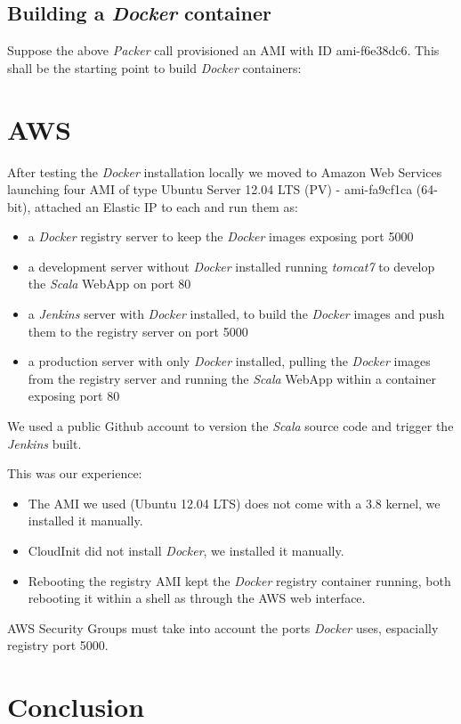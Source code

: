\documentclass[captions=tableheading]{article}
\begin{document}
\subsection{Building a \emph{Docker} container}
\label{sec-7-4}

Suppose the above \emph{Packer} call provisioned an AMI with ID ami-f6e38dc6. This shall be the starting point to build \emph{Docker} containers:
\section{AWS}
\label{sec-8}

After testing the \emph{Docker} installation locally we moved to Amazon Web Services launching four AMI  of type Ubuntu Server 12.04 LTS (PV) - ami-fa9cf1ca (64-bit), attached an Elastic IP to each and run them as:
\begin{itemize}
\item a \emph{Docker} registry server to keep the \emph{Docker} images exposing port 5000
\item a development server  without \emph{Docker} installed running \emph{tomcat7} to develop the  \emph{Scala} WebApp on port 80
\item a \emph{Jenkins} server with \emph{Docker} installed, to build the \emph{Docker} images and push them to the registry server on port 5000
\item a production server with only \emph{Docker} installed, pulling the \emph{Docker} images from the registry server and running the  \emph{Scala} WebApp within a container exposing port 80
\end{itemize}
We used a public Github account to version the \emph{Scala} source code and trigger the \emph{Jenkins} built.

This was our experience:
\begin{itemize}
\item The AMI we used (Ubuntu 12.04 LTS) does not come with a 3.8 kernel, we installed it  manually.
\item CloudInit did not install \emph{Docker}, we installed it  manually.
\item Rebooting the registry AMI kept the \emph{Docker} registry container running, both rebooting it within a shell as through the AWS web interface.
\end{itemize}

AWS Security Groups must take into account the ports \emph{Docker} uses, espacially registry port 5000.
\section{Conclusion}
\label{sec-9}
\end{document}
